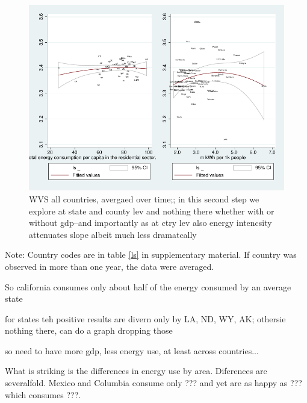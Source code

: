 \documentclass[10pt, letterpaper]{article}
\begin{document}
\begin{spacing}{1.4}
\begin{figure}[H]
 \includegraphics[width=6in]{graphsAndTables/stateCa.pdf}\centering
\caption{WVS all countries, avergaed over time;; in this second step we explore
at state and county lev and nothing there whether with or without gdp--and
importantly as at ctry lev also energy intencsity attenuates slope albeit much
less dramatcally}\label{stateCa}
 \end{figure} {\scriptsize Note: Country codes are in table \ref{ls} in supplementary material. If country was observed in more than one year, the data were averaged. }


So california consumes only about half of the energy consumed by an average
state %


for states teh positive results are divern only by LA, ND, WY, AK; othersie
nothing there, can do a graph dropping those



so need to have more gdp, less energy use, at least across countries...

What is striking is the differences in energy use by area. Diferences are
severalfold. Mexico and Columbia
consume only ??? and yet are as happy as ??? which consumes ???.
 

\end{spacing}
\end{document}
